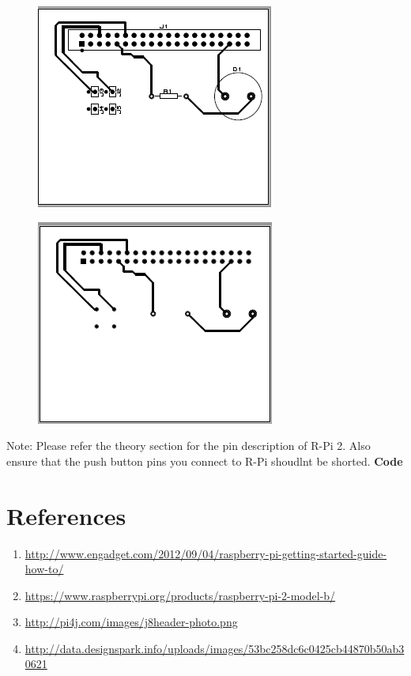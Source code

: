 \documentclass[11pt,a4paper]{article}
\begin{document}
		\begin{figure}[h!]
			\includegraphics[scale=0.4]{pcb_front.png}
			\centering
		\end{figure}
		\begin{figure}[h!]
			\includegraphics[scale=0.4]{back_track.png}
			\centering
		\end{figure}
		Note: Please refer the theory section for the pin description of R-Pi 2. Also ensure that the push button pins you connect to R-Pi shoudlnt be shorted.
		\vspace{0.3cm}
		\newline
		\textbf{Code}
		
		
	\section{References}
	\begin{enumerate}
		\item \url{http://www.engadget.com/2012/09/04/raspberry-pi-getting-started-guide-how-to/}
		\item \url{https://www.raspberrypi.org/products/raspberry-pi-2-model-b/}
		\item \url{http://pi4j.com/images/j8header-photo.png}
		\item \url{http://data.designspark.info/uploads/images/53bc258dc6c0425cb44870b50ab30621}
	\end{enumerate}
	
	
\end{document}

